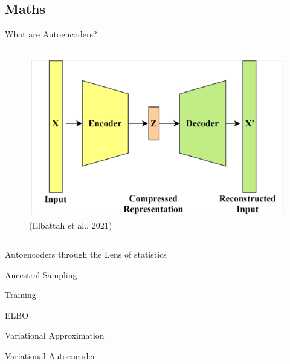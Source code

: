 \documentclass[aspectratio=169,xcolor=dvipsnames]{beamer}
\begin{document}
\subsection{Maths}
\begin{frame}{What are Autoencoders?}
  \begin{columns}
    \begin{column}{0.7\textwidth}
      \centering
      \begin{figure}
        \centering
        \includegraphics[width=\textwidth]{figures/VAE_figure.png}
        \caption{(Elbattah et al., 2021)}
      \end{figure}
    \end{column}
  \end{columns}
\end{frame}
\begin{frame}{Autoencoders through the Lens of statistics}
  
\end{frame}
\begin{frame}{Ancestral Sampling}

\end{frame}
\begin{frame}{Training}
  
\end{frame}
\begin{frame}{ELBO}
  
\end{frame}
\begin{frame}{Variational Approximation}
  
\end{frame}
\begin{frame}{Variational Autoencoder}

\end{frame}
\end{document}

